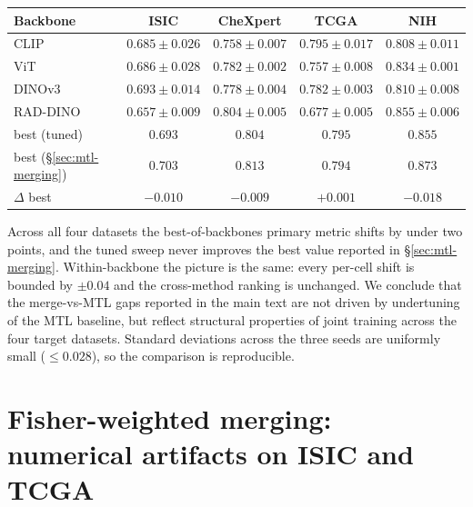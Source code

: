 \documentclass{article}
\begin{document}
\begin{center}
\small
\begin{tabular}{lcccc}
\toprule
Backbone & ISIC & CheXpert & TCGA & NIH \\
\midrule
CLIP     & $0.685 \pm 0.026$ & $0.758 \pm 0.007$ & $0.795 \pm 0.017$ & $0.808 \pm 0.011$ \\
ViT      & $0.686 \pm 0.028$ & $0.782 \pm 0.002$ & $0.757 \pm 0.008$ & $0.834 \pm 0.001$ \\
DINOv3   & $0.693 \pm 0.014$ & $0.778 \pm 0.004$ & $0.782 \pm 0.003$ & $0.810 \pm 0.008$ \\
RAD-DINO & $0.657 \pm 0.009$ & $0.804 \pm 0.005$ & $0.677 \pm 0.005$ & $0.855 \pm 0.006$ \\
\midrule
best (tuned)  & $0.693$ & $0.804$ & $0.795$ & $0.855$ \\
best (\S\ref{sec:mtl-merging}) & $0.703$ & $0.813$ & $0.794$ & $0.873$ \\
$\Delta$ best & $-0.010$ & $-0.009$ & $+0.001$ & $-0.018$ \\
\bottomrule
\end{tabular}
\end{center}

Across all four datasets the best-of-backbones primary metric shifts by under two points, and the tuned sweep never improves the best value reported in \S\ref{sec:mtl-merging}. Within-backbone the picture is the same: every per-cell shift is bounded by $\pm 0.04$ and the cross-method ranking is unchanged. We conclude that the merge-vs-MTL gaps reported in the main text are not driven by undertuning of the MTL baseline, but reflect structural properties of joint training across the four target datasets. Standard deviations across the three seeds are uniformly small ($\le 0.028$), so the comparison is reproducible.

\section{Fisher-weighted merging: numerical artifacts on ISIC and TCGA}
\end{document}
